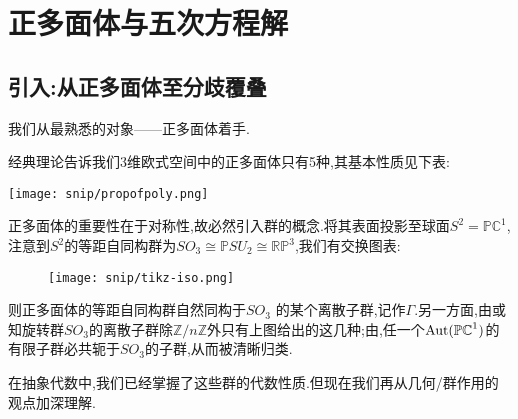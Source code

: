 
\chapter{正多面体与五次方程解}




\section{引入:从正多面体至分歧覆叠}
我们从最熟悉的对象——正多面体着手.

经典理论告诉我们3维欧式空间中的正多面体只有5种,其基本性质见下表:

\begin{table}[ht]
	\texttt{[image: snip/propofpoly.png]}
\end{table}

	正多面体的重要性在于对称性,故必然引入群的概念.将其表面投影至球面$S^2=\mathbb{P}\mathbb{C}^1$,注意到$S^2$的等距自同构群为$SO_3\cong \mathbb{P}SU_2 \cong\mathbb{R}\mathbb{P}^3$,我们有交换图表:
\begin{figure}[ht]
	\centering
	\texttt{[image: snip/tikz-iso.png]}
\end{figure}
		
		
		则正多面体的等距自同构群自然同构于$SO_3$ 的某个离散子群,记作$\Gamma$.另一方面,由\cite[5.9.1]{artin2011algebra}或\cite[2.6]{shurman1997geometry}知旋转群$SO_3$的离散子群除$\mathbb{Z}/n\mathbb{Z}$外只有上图给出的这几种;由\cite{shurman1997geometry},任一个$\operatorname{Aut} (\mathbb{PC}^1)$的有限子群必共轭于$SO_3$的子群,从而被清晰归类.
		

		在抽象代数中,我们已经掌握了这些群的代数性质.但现在我们再从几何/群作用的观点加深理解.
		
